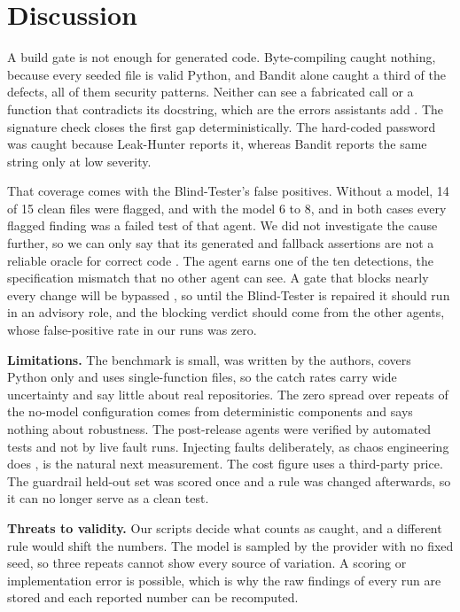 \documentclass[12pt,onecolumn,draftclsnofoot]{IEEEtran}
\begin{document}
\section{Discussion}
A build gate is not enough for generated code. Byte-compiling caught nothing, because every seeded file is valid Python, and Bandit alone caught a third of the defects, all of them security patterns. Neither can see a fabricated call or a function that contradicts its docstring, which are the errors assistants add \cite{spracklen2025}. The signature check closes the first gap deterministically. The hard-coded password was caught because Leak-Hunter reports it, whereas Bandit reports the same string only at low severity.

That coverage comes with the Blind-Tester's false positives. Without a model, 14 of 15 clean files were flagged, and with the model 6 to 8, and in both cases every flagged finding was a failed test of that agent. We did not investigate the cause further, so we can only say that its generated and fallback assertions are not a reliable oracle for correct code \cite{barr2015}. The agent earns one of the ten detections, the specification mismatch that no other agent can see. A gate that blocks nearly every change will be bypassed \cite{johnson2013}, so until the Blind-Tester is repaired it should run in an advisory role, and the blocking verdict should come from the other agents, whose false-positive rate in our runs was zero.

\textbf{Limitations.} The benchmark is small, was written by the authors, covers Python only and uses single-function files, so the catch rates carry wide uncertainty and say little about real repositories. The zero spread over repeats of the no-model configuration comes from deterministic components and says nothing about robustness. The post-release agents were verified by automated tests and not by live fault runs. Injecting faults deliberately, as chaos engineering does \cite{basiri2016}, is the natural next measurement. The cost figure uses a third-party price. The guardrail held-out set was scored once and a rule was changed afterwards, so it can no longer serve as a clean test.

\textbf{Threats to validity.} Our scripts decide what counts as caught, and a different rule would shift the numbers. The model is sampled by the provider with no fixed seed, so three repeats cannot show every source of variation. A scoring or implementation error is possible, which is why the raw findings of every run are stored and each reported number can be recomputed.
\end{document}
